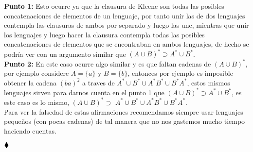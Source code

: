\textbf{Punto 1:} Esto ocurre ya que la clausura de Kleene son todas las posibles concatenaciones de elementos de un lenguaje, por tanto unir las de dos lenguajes contempla las clausuras de ambos por separado y luego las une, mientras que unir los lenguajes y luego hacer la clausura contempla todas las posibles concatenaciones de elementos que se encontraban en ambos lenguajes, de hecho se podría ver con un argumento similar que $(A\cup B)^*\supset A^* \cup B^*$.\\


\textbf{Punto 2:} En este caso ocurre algo similar y es que faltan cadenas de $(A \cup B)^*$, por ejemplo considere $A=\{a\}$ y $B=\{b\}$, entonces por ejemplo es imposible obtener la cadena $(ba)^2$ a traves de $A^* \cup B^* \cup A^* B^* \cup B^* A^*$, estos mismos lenguajes sirven para darnos cuenta en el punto 1 que $(A \cup B)^*\supset A^*\cup B^*$, es este caso es lo mismo, $(A \cup B)^* \supset$ $A^* \cup B^* \cup A^* B^* \cup B^* A^*$.\\

Para ver la falsedad de estas afirmaciones recomendamos siempre usar lenguajes pequeños (con pocas cadenas) de tal manera que no nos gastemos mucho tiempo haciendo cuentas. 


$\hfill \blacklozenge$